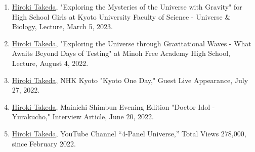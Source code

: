 \documentclass[uplatex, 12pt]{article}
\begin{document}
\begin{enumerate}
\item \uline{Hiroki Takeda}, "Exploring the Mysteries of the Universe with Gravity" for High School Girls at Kyoto University Faculty of Science - Universe \& Biology, Lecture, March 5, 2023.\\

\item \uline{Hiroki Takeda}, "Exploring the Universe through Gravitational Waves - What Awaits Beyond Days of Testing" at Minoh Free Academy High School, Lecture, August 4, 2022.\\

\item \uline{Hiroki Takeda}, NHK Kyoto "Kyoto One Day," Guest Live Appearance, July 27, 2022.\\

\item \uline{Hiroki Takeda}, Mainichi Shimbun Evening Edition "Doctor Idol - Yūrakuchō," Interview Article, June 20, 2022.\\

\item \uline{Hiroki Takeda}, YouTube Channel “4-Panel Universe,” Total Views 278,000, since February 2022.\\
\end{enumerate}
\end{document}
